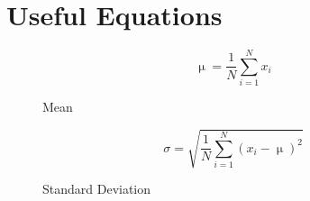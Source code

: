 \chapter{Useful Equations}

\begin{figure}[h!]
\begin{equation}
\upmu = \frac{1}{N}\sum_{i=1}^{N}x_i
\end{equation}
\caption{Mean}
\end{figure}

\begin{figure}[h!]
\begin{equation}
\sigma = \sqrt{\frac{1}{N}\sum_{i=1}^{N}(x_i - \upmu)^2}
\end{equation}
\caption{Standard Deviation}
\end{figure}


